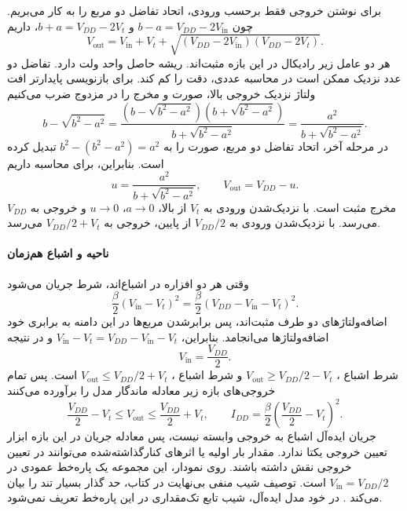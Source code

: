برای نوشتن خروجی فقط برحسب ورودی، اتحاد تفاضل دو مربع را به کار
می‌بریم. چون \(b-a=V_{DD}-2V_{\mathrm{in}}\) و
\(b+a=V_{DD}-2V_t\)، داریم
\begin{equation}
 \boxed{V_{\mathrm{out}}=V_{\mathrm{in}}+V_t+
 \sqrt{(V_{DD}-2V_{\mathrm{in}})(V_{DD}-2V_t)}}.
 \label{eq:inverter-b-transfer}
\end{equation}
هر دو عامل زیر رادیکال در این بازه مثبت‌اند. ریشه حاصل واحد ولت
دارد. تفاضل دو عدد نزدیک ممکن است در محاسبه عددی، دقت را کم کند.
برای بازنویسی پایدارتر افت ولتاژ نزدیک خروجی بالا، صورت و مخرج را
در مزدوج ضرب می‌کنیم
\[
 b-\sqrt{b^2-a^2}
 =\frac{(b-\sqrt{b^2-a^2})(b+\sqrt{b^2-a^2})}
        {b+\sqrt{b^2-a^2}}
 =\frac{a^2}{b+\sqrt{b^2-a^2}}.
\]
در مرحله آخر، اتحاد تفاضل دو مربع، صورت را به
\(b^2-(b^2-a^2)=a^2\) تبدیل کرده است. بنابراین، برای محاسبه داریم
\begin{equation}
 u=\frac{a^2}{b+\sqrt{b^2-a^2}},\qquad
 V_{\mathrm{out}}=V_{DD}-u.
 \label{eq:inverter-b-stable}
\end{equation}
مخرج مثبت است. با نزدیک‌شدن ورودی به \(V_t\) از بالا،
\(a\to0\)، \(u\to0\) و خروجی به \(V_{DD}\) می‌رسد.
با نزدیک‌شدن ورودی به \(V_{DD}/2\) از پایین،
خروجی به \(V_{DD}/2+V_t\) می‌رسد.

\paragraph*{ناحیه  و اشباع هم‌زمان}
وقتی هر دو افزاره در اشباع‌اند، شرط جریان می‌شود
\begin{equation*}
 \frac{\beta}{2}(V_{\mathrm{in}}-V_t)^2
 =\frac{\beta}{2}(V_{DD}-V_{\mathrm{in}}-V_t)^2.
\end{equation*}
اضافه‌ولتاژهای دو طرف مثبت‌اند، پس برابرشدن مربع‌ها در این دامنه
به برابری خود اضافه‌ولتاژها می‌انجامد. بنابراین،
\(V_{\mathrm{in}}-V_t=V_{DD}-V_{\mathrm{in}}-V_t\) و در نتیجه
\begin{equation}
 \boxed{V_{\mathrm{in}}=\frac{V_{DD}}{2}}.
 \label{eq:inverter-c-input}
\end{equation}
شرط اشباع ، \(V_{\mathrm{out}}\ge V_{DD}/2-V_t\) و
شرط اشباع ، \(V_{\mathrm{out}}\le V_{DD}/2+V_t\) است.
پس تمام خروجی‌های بازه زیر معادله ماندگار مدل را برآورده می‌کنند
\begin{equation}
 \boxed{\frac{V_{DD}}{2}-V_t\le V_{\mathrm{out}}
              \le\frac{V_{DD}}{2}+V_t},\qquad
 I_{DD}=\frac{\beta}{2}\left(\frac{V_{DD}}{2}-V_t\right)^2.
 \label{eq:inverter-c-output-interval}
\end{equation}
جریان ایده‌آل اشباع به خروجی وابسته نیست، پس معادله جریان در این
بازه ابزار تعیین خروجی یکتا ندارد. مقدار بار اولیه یا اثرهای
کنارگذاشته‌شده می‌توانند در تعیین خروجی نقش داشته باشند.
روی نمودار، این مجموعه یک پاره‌خط عمودی در
\(V_{\mathrm{in}}=V_{DD}/2\) است. توصیف شیب منفی بی‌نهایت در
کتاب، حد گذار بسیار تند را بیان می‌کند
\cite[صفحه ۸۸]{weste}. در خود مدل ایده‌آل، شیب تابع تک‌مقداری
در این پاره‌خط تعریف نمی‌شود.

